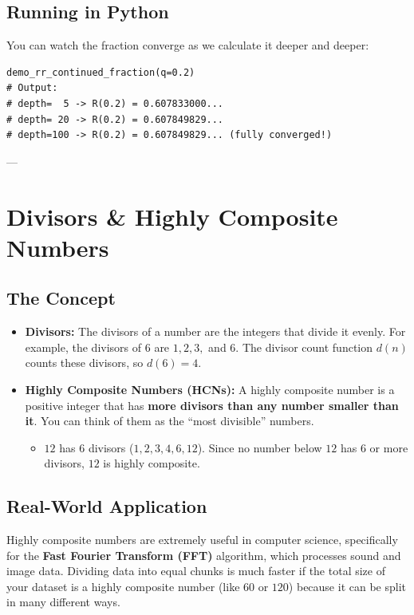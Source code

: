 \documentclass[11pt]{article}
\begin{document}
\subsection{Running in Python}
You can watch the fraction converge as we calculate it deeper and deeper:
\begin{lstlisting}
demo_rr_continued_fraction(q=0.2)
# Output:
# depth=  5 -> R(0.2) = 0.607833000...
# depth= 20 -> R(0.2) = 0.607849829...
# depth=100 -> R(0.2) = 0.607849829... (fully converged!)
\end{lstlisting}

---

\section{Divisors \& Highly Composite Numbers}

\subsection{The Concept}
\begin{itemize}
    \item \textbf{Divisors:} The divisors of a number are the integers that divide it evenly. For example, the divisors of $6$ are $1, 2, 3,$ and $6$. The divisor count function $d(n)$ counts these divisors, so $d(6) = 4$.
    \item \textbf{Highly Composite Numbers (HCNs):} A highly composite number is a positive integer that has \textbf{more divisors than any number smaller than it}. You can think of them as the ``most divisible'' numbers.
    \begin{itemize}
        \item $12$ has $6$ divisors ($1, 2, 3, 4, 6, 12$). Since no number below $12$ has $6$ or more divisors, $12$ is highly composite.
    \end{itemize}
\end{itemize}

\subsection{Real-World Application}
Highly composite numbers are extremely useful in computer science, specifically for the \textbf{Fast Fourier Transform (FFT)} algorithm, which processes sound and image data. Dividing data into equal chunks is much faster if the total size of your dataset is a highly composite number (like $60$ or $120$) because it can be split in many different ways.
\end{document}
